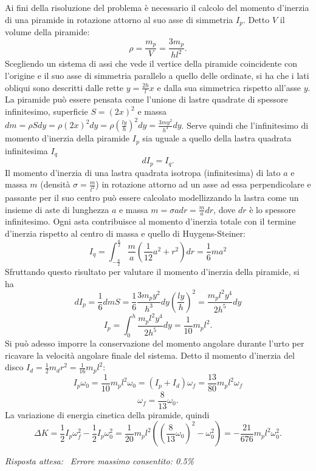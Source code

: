 \documentclass[a4paper,12pt]{article}
\begin{document}
Ai fini della risoluzione del problema è necessario il calcolo del momento d'inerzia di una piramide in rotazione attorno al suo asse di simmetria $I_p$. Detto $V$ il volume della piramide:
\[
\rho = \frac{m_p}{V} = \frac{3m_p}{hl^2}. \tag{10.0}
\]
Scegliendo un sistema di assi che vede il vertice della piramide coincidente con l'origine e il suo asse di simmetria parallelo a quello delle ordinate, si ha che i lati obliqui sono descritti dalle rette $y = \frac{2h}{l}x$ e dalla sua simmetrica rispetto all'asse $y$. La piramide può essere pensata come l'unione di lastre quadrate di spessore infinitesimo, superficie $S = (2x)^2$ e massa $dm = \rho S dy = \rho (2x)^2 dy = \rho \left(\frac{ly}{h}\right)^2dy = \frac{3my^2}{h^3}dy$.
Serve quindi che l'infinitesimo di momento d'inerzia della piramide $I_p$ sia uguale a quello della lastra quadrata infinitesima $I_q$
\[
dI_p = I_q. \tag{10.1}
\]
Il momento d'inerzia di una lastra quadrata isotropa (infinitesima) di lato $a$ e massa $m$ (densità $\sigma = \frac{m}{l^2}$) in rotazione attorno ad un asse ad essa perpendicolare e passante per il suo centro può essere calcolato modellizzando la lastra come un insieme di aste di lunghezza $a$ e massa $m = \sigma a dr = \frac{m}{a}dr$, dove $dr$ è lo spessore infinitesimo. Ogni asta contribuisce al momento d'inerzia totale con il termine d'inerzia rispetto al centro di massa e quello di Huygens-Steiner:
\[
I_q = \int_{-\frac{a}{2}}^{\frac{a}{2}} \frac{m}{a} (\frac{1}{12}a^2 + r^2) dr = \frac{1}{6}ma^2 \tag{10.2}
\] 
Sfruttando questo risultato per valutare il momento d'inerzia della piramide, si ha
\[
dI_p = \frac{1}{6} dmS  = \frac{1}{6} \frac{3m_py^2}{h^3}dy (\frac{ly}{h})^2 = \frac{m_pl^2y^4}{2h^5}dy \tag{10.3}
\]
\[
 I_p = \int_{0}^{h} \frac{m_pl^2y^4}{2h^5}dy = \frac{1}{10}m_pl^2. \tag{10.4}
\]
Si può adesso imporre la conservazione del momento angolare durante l'urto per ricavare la velocità angolare finale del sistema. Detto il momento d'inerzia del disco $I_d = \frac{1}{2}m_dr^2 = \frac{1}{16}m_pl^2$:
\[
I_p\omega_0 = \frac{1}{10}m_pl^2\omega_0 = (I_p + I_d)\omega_f = \frac{13}{80}m_pl^2\omega_f \tag{10.5}
\]
\[
\omega_f = \frac{8}{13}\omega_0. \tag{10.6}
\]
La variazione di energia cinetica della piramide, quindi
\[
\Delta K = \frac{1}{2}I_p\omega_f^2 - \frac{1}{2}I_p\omega_0^2 = \frac{1}{20}m_pl^2\left(\left(\frac{8}{13}\omega_0\right)^2- \omega_0^2\right) = -\frac{21}{676}m_pl^2\omega_0^2. \tag{10.7}
\]

\textit{Risposta attesa:}  \, \textit{Errore massimo consentito: 0.5\%}
\end{document}
